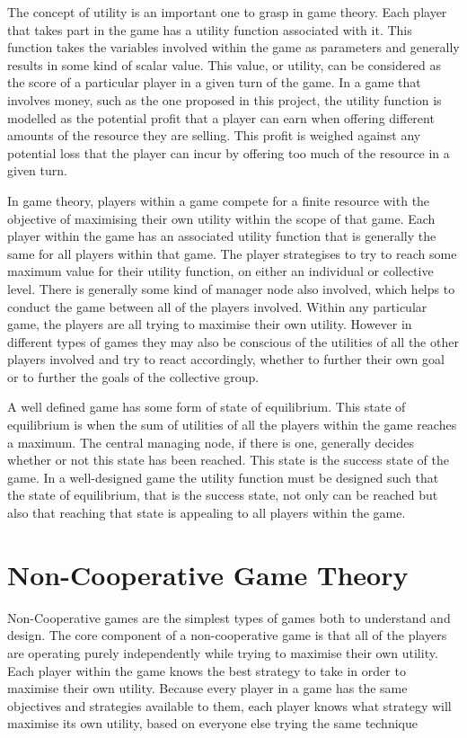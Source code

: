 \documentclass[a4paper, notitlepage]{report}
\begin{document}
The concept of utility is an important one to grasp in game theory. Each player
that takes part in the game has a utility function associated with it. This
function takes the variables involved within the game as parameters and
generally results in some kind of scalar value. This value, or utility, can be
considered as the score of a particular player in a given turn of the game. In a
game that involves money, such as the one proposed in this project, the utility
function is modelled as the potential profit that a player can earn when offering
different amounts of the resource they are selling. This profit is weighed
against any potential loss that the player can incur by offering too much of the
resource in a given turn.

In game theory, players within a game compete for a finite resource with the
objective of maximising their own utility within the scope of that game. Each
player within the game has an associated utility function that is generally the
same for all players within that game. The player strategises to try to reach
some maximum value for their utility function, on either an
individual or collective level. There is generally some kind of manager node
also involved, which helps to conduct the game between all of the players
involved. Within any particular game, the players are all trying to maximise
their own utility. However in different types of games they may also be
conscious of the utilities of all the other players involved and try to react
accordingly, whether to further their own goal or to further the goals of the
collective group.

A well defined game has some form of state of equilibrium. This state of
equilibrium is when the sum of utilities of all the players within the game
reaches a maximum. The central managing node, if there is one, generally decides
whether or not this state has been reached. This state is the success state of
the game. In a well-designed game the utility function must be designed such
that the state of equilibrium, that is the success state, not only can be
reached but also that reaching that state is appealing to all players within the
game.
\section{Non-Cooperative Game Theory}
\label{sec:org30be210}
Non-Cooperative games are the simplest types of games both to understand and
design. The core component of a non-cooperative game is that all of the players
are operating purely independently while trying to maximise their own utility.
Each player within the game knows the best strategy to take in order to maximise
their own utility. Because every player in a game has the same objectives and
strategies available to them, each player knows what strategy will maximise its
own utility, based on everyone else trying the same technique
\end{document}
